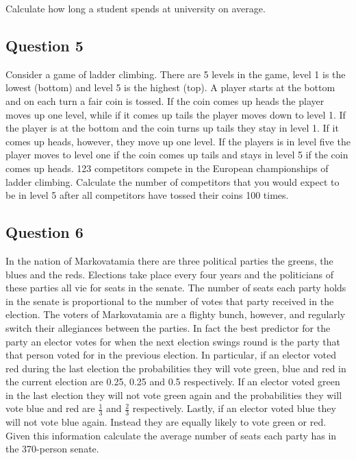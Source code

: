 \documentclass[a4paper]{article}
\begin{document}
\noindent Calculate how long a student spends at university on average. 

\subsection{Question 5}

Consider a game of ladder climbing.  There are 5 levels in the game, level 1 is the lowest (bottom) and level 5 is the highest (top).  A player starts at the bottom and on each turn a 
fair coin is tossed.  If the coin comes up heads the player moves up one level, while if it comes up tails the player moves down to level 1.  If the player is at the bottom and the coin turns up 
tails they stay in level 1.  If it comes up heads, however, they move up one level.  If the players is in level five the player moves to level one if the coin comes up tails and stays in level 5 
if the coin comes up heads.  123 competitors compete in the European championships of ladder climbing.  Calculate the number of competitors that you would expect to be in level 5 after all 
competitors have tossed their coins 100 times.

\subsection{Question 6}

In the nation of Markovatamia there are three political parties the greens, the blues and the reds.  Elections take place every four years and the politicians of these parties all vie for seats in the senate.  The number of seats each party holds in the senate is proportional to the number of votes that party received in the election.   The voters of Markovatamia are a flighty bunch, however, and regularly switch their allegiances between the parties.  In fact the best predictor for the party an elector votes for when the next election swings round is the party that that person voted for in the previous election.  In particular, if an elector voted red during the last election the probabilities they will vote green, blue and red in the current election are 0.25, 0.25 and 0.5 respectively.  If an elector voted green in the last election they will not vote green again and the probabilities they will vote blue and red are $\frac{1}{3}$ and $\frac{2}{3}$ respectively.  Lastly, if an elector voted blue they will not vote blue again.  Instead they are equally likely to vote green or red.  Given this information calculate the average number of seats each party has in the 370-person senate. 
\end{document}
